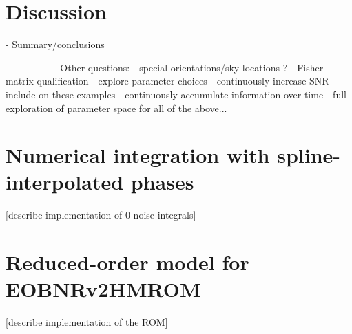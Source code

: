 \documentclass[aps,showpacs,twocolumn,prd,superscriptaddress,nofootinbib]{revtex4-1}
\begin{document}

\section{Discussion}
\label{sec:discussion}

- Summary/conclusions


----------------
Other questions:
- special orientations/sky locations ?
- Fisher matrix qualification - explore parameter choices
- continuously increase SNR - include on these examples
- continuously accumulate information over time
- full exploration of parameter space for all of the above...



\appendix


\section{Numerical integration with spline-interpolated phases}
\label{sec:numintegration}

[describe implementation of 0-noise integrals]


\section{Reduced-order model for EOBNRv2HMROM}
\label{sec:rom}

[describe implementation of the ROM]



\end{document}
